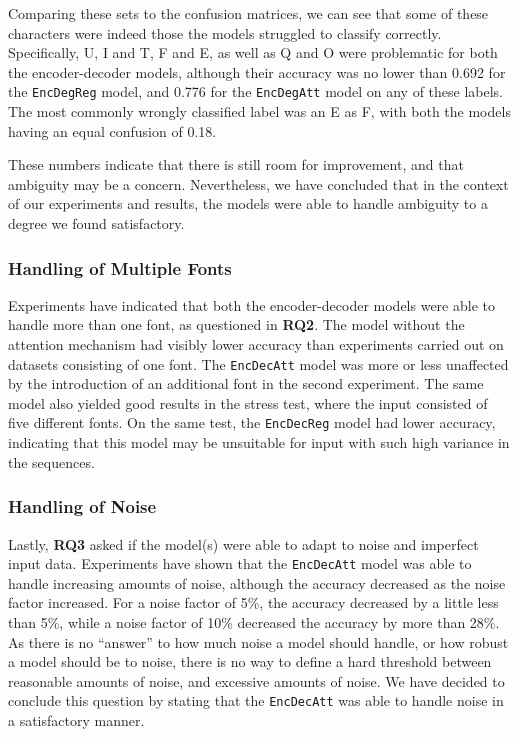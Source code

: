 Comparing these sets to the confusion matrices, we can see that some of these characters were indeed those the models struggled to classify correctly. Specifically, U, I and T, F and E, as well as Q and O were problematic for both the encoder-decoder models, although their accuracy was no lower than 0.692 for the {\tt EncDegReg} model, and 0.776 for the {\tt EncDegAtt} model on any of these labels. The most commonly wrongly classified label was an E as F, with both the models having an equal confusion of 0.18. 

These numbers indicate that there is still room for improvement, and that ambiguity may be a concern. Nevertheless, we have concluded that in the context of our experiments and results, the models were able to handle ambiguity to a degree we found satisfactory.

\newpage
\subsubsection{Handling of Multiple Fonts}
Experiments have indicated that both the encoder-decoder models were able to handle more than one font, as questioned in \textbf{RQ2}. The model without the attention mechanism had visibly lower accuracy than experiments carried out on datasets consisting of one font. The {\tt EncDecAtt} model was more or less unaffected by the introduction of an additional font in the second experiment. The same model also yielded good results in the stress test, where the input consisted of five different fonts. On the same test, the {\tt EncDecReg} model had lower accuracy, indicating that this model may be unsuitable for input with such high variance in the sequences.

\subsubsection{Handling of Noise}
Lastly, \textbf{RQ3} asked if the model(s) were able to adapt to noise and imperfect input data. Experiments have shown that the {\tt EncDecAtt} model was able to handle increasing amounts of noise, although the accuracy decreased as the noise factor increased. For a noise factor of 5\%, the accuracy decreased by a little less than 5\%, while a noise factor of 10\% decreased the accuracy by more than 28\%. As there is no ``answer'' to how much noise a model should handle, or how robust a model should be to noise, there is no way to define a hard threshold between reasonable amounts of noise, and excessive amounts of noise. We have decided to conclude this question by stating that the {\tt EncDecAtt} was able to handle noise in a satisfactory manner. 

